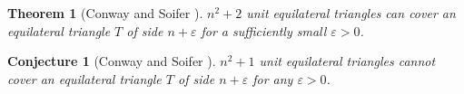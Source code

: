 \documentclass[a4paper]{amsart}
\theoremstyle{plain}
\newtheorem{theorem}{Theorem}
\newtheorem{conjecture}{Conjecture}
\theoremstyle{definition}
\begin{document}

\begin{theorem}[Conway and Soifer \cite{conway2004coverup, conway2005covering}]
\label{thm:main-prev}
$n^2 + 2$ unit equilateral triangles can cover an equilateral triangle $T$ of side $n + \varepsilon$ for a sufficiently small $\varepsilon > 0$.
\end{theorem}

\begin{conjecture}[Conway and Soifer \cite{conway2004coverup}]
\label{conj:main}
$n^2 + 1$ unit equilateral triangles cannot cover an equilateral triangle $T$ of side $n + \varepsilon$ for any $\varepsilon > 0$.
\end{conjecture}
\end{document}
